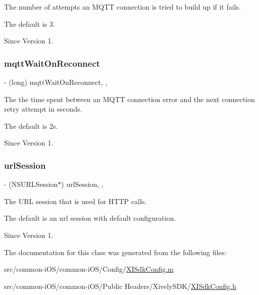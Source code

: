 The number of attempts an M\+Q\+TT connection is tried to build up if it fails. 

The default is 3. \begin{DoxySince}{Since}
Version 1. 
\end{DoxySince}
\hypertarget{class_x_i_sdk_config_a7e1114e4fbf145f2f9e88e5e0ecbe4cd}{}\label{class_x_i_sdk_config_a7e1114e4fbf145f2f9e88e5e0ecbe4cd} 
\subsubsection{\texorpdfstring{mqtt\+Wait\+On\+Reconnect}{mqttWaitOnReconnect}}
{\footnotesize\ttfamily -\/ (long) mqtt\+Wait\+On\+Reconnect\hspace{0.3cm}{\ttfamily [read]}, {\ttfamily [nonatomic]}, {\ttfamily [assign]}}



The the time spent between an M\+Q\+TT connection error and the next connection retry attempt in seconds. 

The default is 2s. \begin{DoxySince}{Since}
Version 1. 
\end{DoxySince}
\hypertarget{class_x_i_sdk_config_a01bb2fc51f6bca0e8a5bd32281abeee7}{}\label{class_x_i_sdk_config_a01bb2fc51f6bca0e8a5bd32281abeee7} 
\subsubsection{\texorpdfstring{url\+Session}{urlSession}}
{\footnotesize\ttfamily -\/ (N\+S\+U\+R\+L\+Session$\ast$) url\+Session\hspace{0.3cm}{\ttfamily [read]}, {\ttfamily [nonatomic]}, {\ttfamily [assign]}}



The U\+RL session that is used for H\+T\+TP calls. 

The default is an url session with default configuration. \begin{DoxySince}{Since}
Version 1. 
\end{DoxySince}


The documentation for this class was generated from the following files\+:\begin{DoxyCompactItemize}
\item 
src/common-\/i\+O\+S/common-\/i\+O\+S/\+Config/\hyperlink{_x_i_sdk_config_8m}{X\+I\+Sdk\+Config.\+m}\item 
src/common-\/i\+O\+S/common-\/i\+O\+S/\+Public Headers/\+Xively\+S\+D\+K/\hyperlink{_x_i_sdk_config_8h}{X\+I\+Sdk\+Config.\+h}\end{DoxyCompactItemize}

